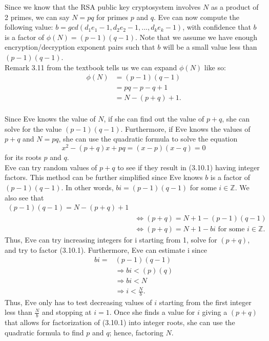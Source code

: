 \documentclass[12pt]{article}
\begin{document}
\begin{enumerate}[a)]
  Since we know that the RSA public key cryptosystem involves $N$ as a product of 2 primes, we can say $N=pq$ for primes $p$ and $q$.  Eve can now compute the following value: $b=gcd(d_{1}e_{1}-1, d_{2}e_{2}-1, ..., d_{k}e_{k}-1)$, with confidence that $b$ is a factor of $\phi (N)=(p-1)(q-1)$. Note that we assume we have enough encryption/decryption exponent pairs such that $b$ will be a small value less than $(p-1)(q-1)$.\\ 
  
  Remark 3.11 from the textbook tells us we can expand $\phi (N)$ like so:
  \begin{align*}
  \phi (N)&=(p-1)(q-1)\\
  &=pq-p-q+1\\
  &=N-(p+q)+1.  \\
  \end{align*}
  
  Since Eve knows the value of $N$, if she can find out the value of $p+q$, she can solve for the value $(p-1)(q-1)$.  Furthermore, if Eve knows the values of $p+q$ and $N=pq$, she can use the quadratic formula to solve the equation 
  \begin{equation} \tag{3.10.1}
  x^{2}-(p+q)x+pq=(x-p)(x-q)=0
  \end{equation}
  for its roots $p$ and $q$.\\
  
  Eve can try random values of $p+q$ to see if they result in (3.10.1) having integer factors.  This method can be further simplified since Eve knows $b$ is a factor of $(p-1)(q-1)$.  In other words, $bi=(p-1)(q-1)$ for some $i \in \mathbb{Z}$.  We also see that 
  \begin{align*}
  (p-1)(q-1)=N-(p+q)+1 \\
  &\Leftrightarrow (p+q)=N+1-(p-1)(q-1) \\
  &\Leftrightarrow (p+q)=N+1-bi \text{ for some } i \in \mathbb{Z}.
  \end{align*}
  Thus, Eve can try increasing integers for i starting from 1, solve for $(p+q)$, and try to factor (3.10.1).  Furthermore, Eve can estimate i since 
  \begin{align*}
  bi=&(p-1)(q-1) \\
  &\Rightarrow bi < (p)(q) \\
  &\Rightarrow bi < N \\
  &\Rightarrow i < \frac{N}{b}.
  \end{align*}
  Thus, Eve only has to test decreasing values of $i$ starting from the first integer less than $\frac{N}{b}$ and stopping at $i=1$.  Once she finds a value for $i$ giving a $(p+q)$ that allows for factorization of (3.10.1) into integer roots, she can use the quadratic formula to find $p$ and $q$; hence, factoring $N$.
  \color{black}
  \pagebreak
  

\end{enumerate}
\end{document}
